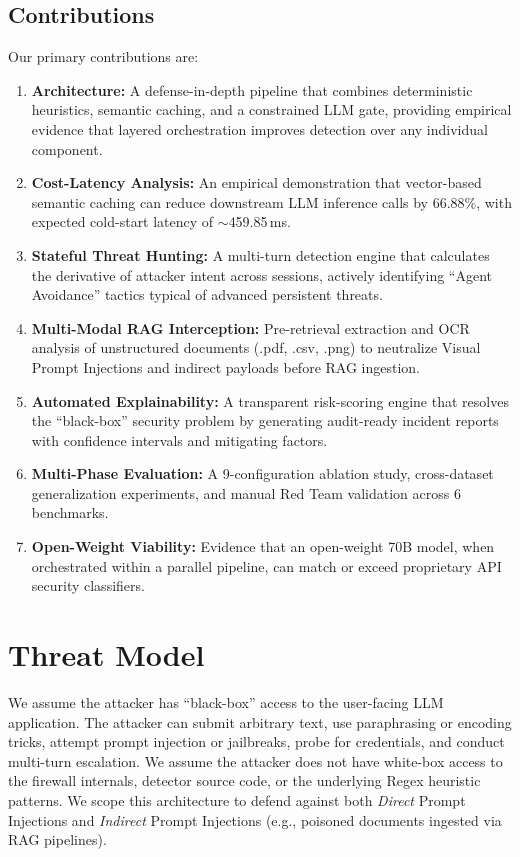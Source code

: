 \documentclass[conference]{IEEEtran}
\begin{document}
\subsection{Contributions}
Our primary contributions are:
\begin{enumerate}
    \item \textbf{Architecture:} A defense-in-depth pipeline that combines deterministic heuristics, semantic caching, and a constrained LLM gate, providing empirical evidence that layered orchestration improves detection over any individual component.
    \item \textbf{Cost-Latency Analysis:} An empirical demonstration that vector-based semantic caching can reduce downstream LLM inference calls by 66.88\%, with expected cold-start latency of $\sim$459.85\,ms.
    \item \textbf{Stateful Threat Hunting:} A multi-turn detection engine that calculates the derivative of attacker intent across sessions, actively identifying ``Agent Avoidance'' tactics typical of advanced persistent threats.
    \item \textbf{Multi-Modal RAG Interception:} Pre-retrieval extraction and OCR analysis of unstructured documents (.pdf, .csv, .png) to neutralize Visual Prompt Injections and indirect payloads before RAG ingestion.
    \item \textbf{Automated Explainability:} A transparent risk-scoring engine that resolves the ``black-box'' security problem by generating audit-ready incident reports with confidence intervals and mitigating factors.
    \item \textbf{Multi-Phase Evaluation:} A 9-configuration ablation study, cross-dataset generalization experiments, and manual Red Team validation across 6 benchmarks.
    \item \textbf{Open-Weight Viability:} Evidence that an open-weight 70B model, when orchestrated within a parallel pipeline, can match or exceed proprietary API security classifiers.
\end{enumerate}

\section{Threat Model}
We assume the attacker has ``black-box'' access to the user-facing LLM application. The attacker can submit arbitrary text, use paraphrasing or encoding tricks, attempt prompt injection or jailbreaks, probe for credentials, and conduct multi-turn escalation. We assume the attacker does not have white-box access to the firewall internals, detector source code, or the underlying Regex heuristic patterns. We scope this architecture to defend against both \textit{Direct} Prompt Injections and \textit{Indirect} Prompt Injections (e.g., poisoned documents ingested via RAG pipelines).
\end{document}
